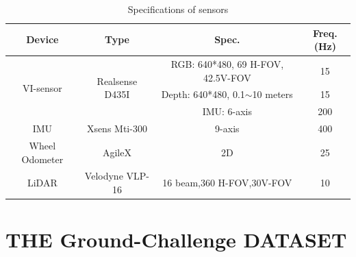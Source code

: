 \documentclass[conference]{IEEEtran}
\begin{document}
	\begin{table}[h]
		\centering
		\caption{Specifications of sensors}
		\label{sensor}
		\begin{tabular}{cccc}
			\hline
			Device & Type  & Spec. & Freq.(Hz) \\
			\hline
			\multirow{3}[0]{*}{VI-sensor} & \multirow{3}[0]{*}{Realsense D435I} & RGB: 640*480, 69 H-FOV, 42.5V-FOV & 15 \\
			&       & Depth: 640*480, 0.1$\sim$10 meters & 15 \\
			&       & IMU: 6-axis & 200 \\
			

			IMU   & Xsens Mti-300 & 9-axis & 400 \\
			Wheel Odometer   & AgileX & 2D & 25 \\
			\hline
			LiDAR & Velodyne VLP-16 & 16 beam,360 H-FOV,30V-FOV & 10 \\



			\hline
		\end{tabular}%
		\label{tab:addlabel}%
	\end{table}%

	
	\section{THE Ground-Challenge DATASET}
	
	
\end{document}
